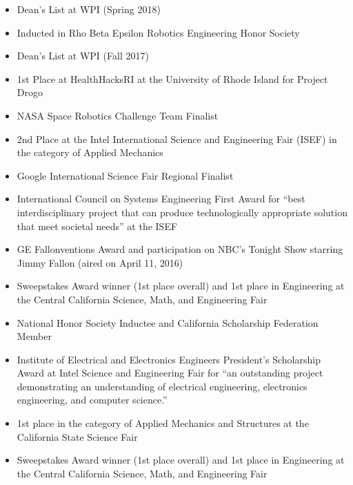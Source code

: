 	\begin{itemize}
		\item Dean’s List at WPI (Spring 2018)
		\item Inducted in Rho Beta Epsilon Robotics Engineering Honor Society
	\end{itemize}
	\begin{itemize}
		\item Dean’s List at WPI (Fall 2017)
		\item 1st Place at HealthHacksRI at the University of Rhode Island for Project Drogo
		\item NASA Space Robotics Challenge Team Finalist
	\end{itemize}
	\begin{itemize}
		\item 2nd Place at the Intel International Science and Engineering Fair (ISEF) in the category of Applied Mechanics
		\item Google International Science Fair Regional Finalist
		\item International Council on Systems Engineering First Award for “best interdisciplinary project that can produce technologically appropriate solution that meet societal needs” at the ISEF
		\item GE Fallonventions Award and participation on NBC’s Tonight Show starring Jimmy Fallon (aired on April 11, 2016)
		\item Sweepstakes Award winner (1st place overall) and 1st place in Engineering at the Central California Science, Math, and Engineering Fair
		\item National Honor Society Inductee and California Scholarship Federation Member
	\end{itemize}
	\begin{itemize}
		\item Institute of Electrical and Electronics Engineers President’s Scholarship Award at Intel Science and Engineering Fair for “an outstanding project demonstrating an understanding of electrical engineering, electronics engineering, and computer science.”
		\item 1st place in the category of Applied Mechanics and Structures at the California State Science Fair
		\item Sweepstakes Award winner (1st place overall) and 1st place in Engineering at the Central California Science, Math, and Engineering Fair
	\end{itemize}